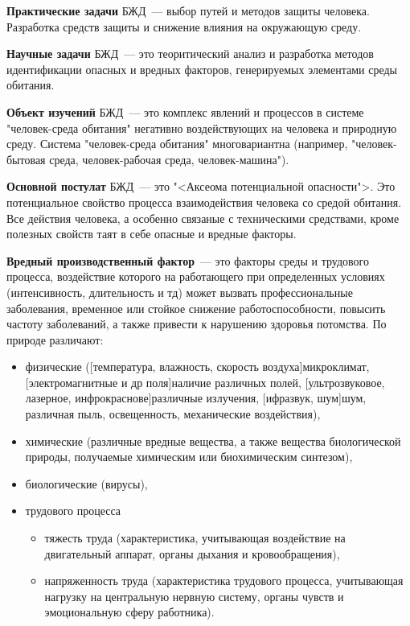 \textbf{Практические задачи} БЖД~--- выбор путей и методов защиты человека. Разработка средств защиты и снижение влияния на окружающую среду.

\textbf{Научные задачи} БЖД~--- это теоритический анализ и разработка методов идентификации опасных и вредных факторов, генерируемых элементами среды обитания.

\textbf{Объект изучений} БЖД~--- это комплекс явлений и процессов в системе "человек-среда обитания" негативно воздействующих на человека и природную среду. Система "человек-среда обитания" многовариантна (например, "человек-бытовая среда, человек-рабочая среда, человек-машина").

\textbf{Основной постулат} БЖД~--- это "<Аксеома потенциальной опасности">. Это потенциальное свойство процесса взаимодействия человека со средой обитания. Все действия человека, а особенно связаные с техническими средствами, кроме полезных свойств таят в себе опасные и вредные факторы.

\textbf{Вредный производственный фактор}~--- это факторы среды и трудового процесса, воздействие которого на работающего при определенных условиях (интенсивность, длительность и тд) может вызвать профессиональные заболевания, временное или стойкое снижение работоспособности, повысить частоту заболеваний, а также привести к нарушению здоровья потомства. По природе различают:
\begin{itemize}
	\item физические ([температура, влажность, скорость воздуха]микроклимат, [электромагнитные и др поля]наличие различных полей, [ультрозвуковое, лазерное, инфрокраснове]различные излучения, [ифразвук, шум]шум, различная пыль, освещенность, механические воздействия),
	\item химические (различные вредные вещества, а также вещества биологической природы, получаемые химическим или биохимическим синтезом),
	\item биологические (вирусы),
	\item трудового процесса
		\begin{itemize}
			\item тяжесть труда (характеристика, учитывающая воздействие на двигательный аппарат, органы дыхания и кровообращения),
			\item напряженность труда (характеристика трудового процесса, учитывающая нагрузку на центральную нервную систему, органы чувств и эмоциональную сферу работника).
		\end{itemize}
\end{itemize}

